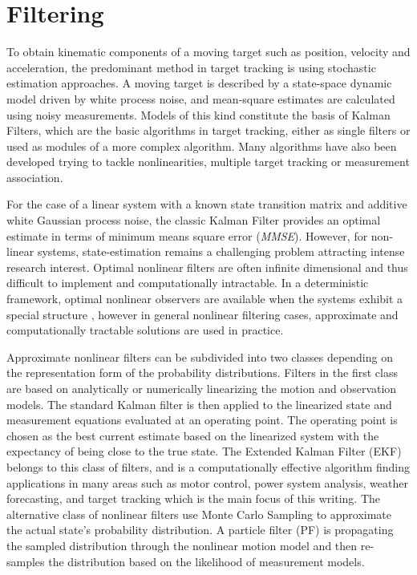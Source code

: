 \chapter{Filtering}

To obtain kinematic components of a moving target such as position, velocity and acceleration, the predominant method in target tracking is using stochastic estimation approaches. A moving target is described by a state-space dynamic model driven by white process noise, and mean-square estimates are calculated using noisy measurements. Models of this kind constitute the basis of Kalman Filters, which are the basic algorithms in target tracking, either as single filters or used as modules of a more complex algorithm. Many algorithms have also been developed trying to tackle nonlinearities, multiple target tracking or measurement association\cite{Ekstrand2012}.

For the case of a linear system with a known state transition matrix and additive white Gaussian process noise, the classic Kalman Filter provides an optimal estimate in terms of minimum means square error (\emph{MMSE}). However, for non-linear systems, state-estimation remains a challenging problem attracting intense research interest. Optimal nonlinear filters are often infinite dimensional and thus difficult to implement and computationally intractable. In a deterministic framework, optimal nonlinear observers are available when the systems exhibit a special structure \cite{Krener1985} , however in general nonlinear filtering cases, approximate and computationally tractable solutions are used in practice\cite{Daum2005}.

Approximate nonlinear filters can be subdivided into two classes depending on the representation form of the probability distributions. Filters in the first class are based on analytically or numerically linearizing the motion and observation models. The standard Kalman filter is then applied to the linearized state and measurement equations evaluated at an operating point. The operating point is chosen as the best current estimate based on the linearized system with the expectancy of being close to the true state\cite{Shalom2001}. The Extended Kalman Filter (EKF) belongs to this class of filters, and is a computationally effective algorithm finding applications in many areas such as motor control\cite{Terzic2001}, power system analysis\cite{Khazraj2016}, weather forecasting\cite{Rosnay2012}, and target tracking which is the main focus of this writing\cite{Shalom1995}. The alternative class of nonlinear filters use Monte Carlo Sampling to approximate the actual state's probability distribution.  A particle filter (PF) is propagating the sampled distribution through the nonlinear motion model and then re-samples the distribution based on the likelihood of measurement models. 

